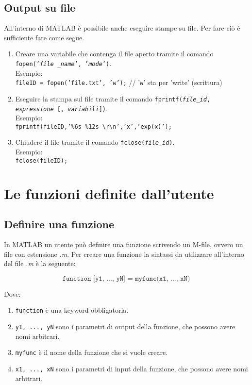 \documentclass[12pt,a4paper,oneside]{book}
\begin{document}
\section{Output su file}
All'interno di MATLAB è possibile anche eseguire stampe su file. Per fare ciò è sufficiente fare come segue.
\begin{enumerate}
	\item	Creare una variabile che contenga il file aperto tramite il comando \texttt{fopen('\textit{file
			\_name}', '\textit{mode}')}. \\
			Esempio: \\ \texttt{fileID = fopen('file.txt', 'w');} // '\texttt{w}' sta per 'write' (scrittura)
			
	\item 	Eseguire la stampa sul file tramite il comando \texttt{fprintf(\textit{file\_id}, \textit{espressione} [, 	\textit{variabili}])}. \\
			Esempio: \\ \texttt{fprintf(fileID,'\%6s \%12s \textbackslash r\textbackslash n','x','exp(x)');}
			
	\item 	Chiudere il file tramite il comando \texttt{fclose(\textit{file\_id})}. \\
			Esempio: \\ \texttt{fclose(fileID);}
\end{enumerate}


\newpage

\chapter{Le funzioni definite dall'utente}
\section{Definire una funzione}
In MATLAB un utente può definire una funzione scrivendo un M-file, ovvero un file con estensione \textit{.m}.
Per creare una funzione la sintassi da utilizzare all'interno del file \textit{.m} è la seguente:

$$  \texttt{function [y1, ..., yN] = myfunc(x1, ..., xN)}$$

Dove:
\begin{enumerate}
	\item	\texttt{function} è una keyword obbligatoria.
	\item	\texttt{y1, ..., yN} sono i parametri di output della funzione, che possono avere nomi arbitrari.
	\item 	\texttt{myfunc} è il nome della funzione che si vuole creare.
	\item	\texttt{x1, ..., xN} sono i parametri di input della funzione, che possono avere nomi arbitrari. 
\end{enumerate}
\end{document}
